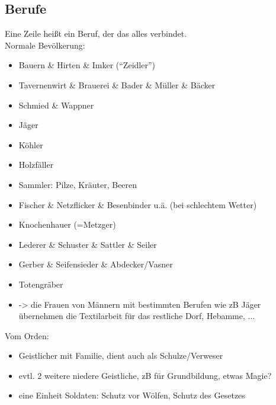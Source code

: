 \subsection{Berufe}
Eine Zeile heißt ein Beruf, der das alles verbindet. \\
Normale Bevölkerung:
\begin{itemize}
	\item Bauern \& Hirten \& Imker ("`Zeidler"')
	\item Tavernenwirt \& Brauerei \& Bader \& Müller \& Bäcker
	\item Schmied \& Wappner
	\item Jäger
	\item Köhler
	\item Holzfäller
	\item Sammler: Pilze, Kräuter, Beeren
	\item Fischer \& Netzflicker \& Besenbinder u.ä. (bei schlechtem Wetter)
	\item Knochenhauer (=Metzger)
	\item Lederer \& Schuster \& Sattler \& Seiler
	\item Gerber \& Seifensieder \& Abdecker/Vasner
	\item Totengräber
	\item -> die Frauen von Männern mit bestimmten Berufen wie zB Jäger übernehmen die Textilarbeit für das restliche Dorf, Hebamme, ...
\end{itemize}

Vom Orden:
\begin{itemize}
	\item Geistlicher mit Familie, dient auch als Schulze/Verweser
	\item evtl. 2 weitere niedere Geistliche, zB für Grundbildung, etwas Magie?
	\item eine Einheit Soldaten: Schutz vor Wölfen, Schutz des Gesetzes
\end{itemize}
